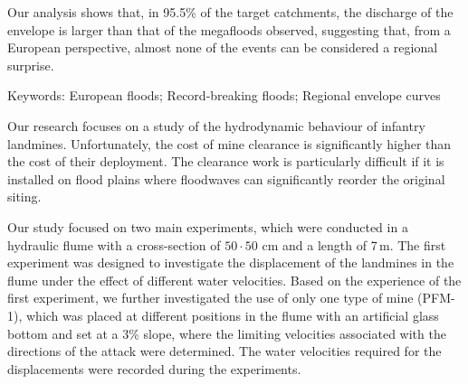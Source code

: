 Our analysis shows that, in 95.5\% of the target catchments, the discharge of the envelope is larger than that of the megafloods observed, suggesting that, from a European perspective, almost none of the events can be considered a regional surprise.

Keywords: European floods; Record-breaking floods; Regional envelope curves
\newpage{}
{}
\begin{flushleft}






\end{flushleft}

\noindent

Our research focuses on a study of the hydrodynamic behaviour of infantry landmines. Unfortunately, the cost of mine clearance is significantly higher than the cost of their deployment. The clearance work is particularly difficult if it is installed on flood plains where floodwaves can significantly reorder the original siting. 

Our study focused on two main experiments, which were conducted in a hydraulic flume with a cross-section of $50\cdot{}50$ cm and a length of 7\,m. The first experiment was designed to investigate the displacement of the landmines in the flume under the effect of different water velocities. Based on the experience of the first experiment, we further investigated the use of only one type of mine (PFM-1), which was placed at different positions in the flume with an artificial glass bottom and set at a 3\% slope, where the limiting velocities associated with the directions of the attack were determined. The water velocities required for the displacements were recorded during the experiments.

